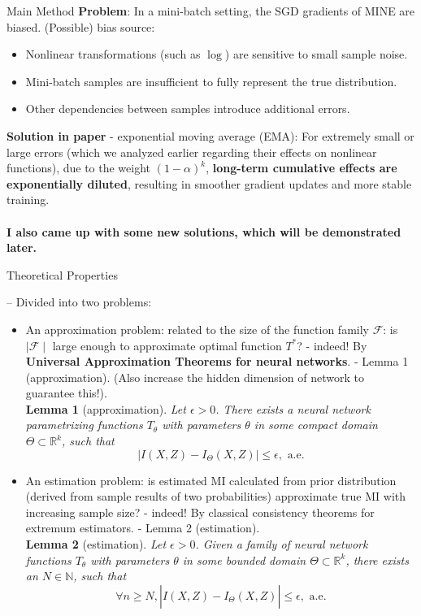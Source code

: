 \documentclass[final]{beamer}
\newlength{\colwidth}
\begin{document}
\begin{frame}[t]
\begin{columns}[t]
\begin{column}{\colwidth}
\begin{alertblock}{Main Method}
            \textbf{Problem}: In a mini-batch setting, the SGD gradients of MINE are biased. (Possible) bias source: 
            \begin{itemize}
                \item Nonlinear transformations (such as $\log$) are sensitive to small sample noise.
                \item Mini-batch samples are insufficient to fully represent the true distribution.
                \item Other dependencies between samples introduce additional errors.
            \end{itemize}
            \textbf{Solution in paper} - exponential moving average (EMA): For extremely small or large errors (which we analyzed earlier regarding their effects on nonlinear functions), due to the weight ${(1-\alpha)}^k$, \textbf{long-term cumulative effects are exponentially diluted}, resulting in smoother gradient updates and more stable training.\\
            ~\\
            \textbf{I also came up with some new solutions, which will be demonstrated later.}

\end{alertblock}

\begin{block}{Theoretical Properties}

      -- Divided into two problems:
        \begin{itemize}
            \item 
            An approximation problem: related to the size of the function family $\mathcal F$: is $\mid\mathcal F\mid$ large enough to approximate optimal function $T^*$? - indeed! By \textbf{Universal Approximation Theorems for neural networks}. - Lemma 1 (approximation). (Also increase the hidden dimension of network to guarantee this!).\\
            \textbf{Lemma 1} (approximation). \textit{Let $\epsilon > 0$. There exists a neural network parametrizing functions $T_\theta$ with parameters $\theta$ in some compact domain $\Theta \subset \mathbb{R}^k$, such that}
            $$|I(X, Z) - I_\Theta(X, Z)| \leq \epsilon, \text{ a.e.}$$

            \item 
            An estimation problem: is estimated MI calculated from prior distribution (derived from sample results of two probabilities) approximate true MI with increasing sample size? - indeed! By classical consistency theorems for extremum estimators. - Lemma 2 (estimation).\\
            \textbf{Lemma 2} (estimation). \textit{Let $\epsilon > 0$. Given a family of neural network functions $T_\theta$ with parameters $\theta$ in some bounded domain $\Theta \subset \mathbb{R}^k$, there exists an $N \in \mathbb N$, such that}
            $$\forall n \geq N, |\widehat{I(X, Z)} - I_\Theta(X, Z)| \leq \epsilon, \text{ a.e.}$$


\end{itemize}
\end{block}
\end{column}
\end{columns}
\end{frame}
\end{document}
